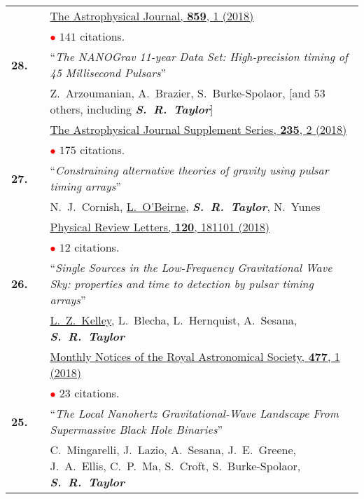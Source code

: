 \documentclass[11pt,letterpaper,sans]{moderncv}
\begin{document}
{\begin{longtable}{rp{0.3cm}p{15.8cm}}
&& \href{http://iopscience.iop.org/article/10.3847/1538-4357/aabd3b/meta}{{\color{color1} The Astrophysical Journal, \textbf{859}, 1 (2018)}}  \\
&& \textcolor{red}{$\bullet$} $141$ citations. \vspace{0.09cm}\\
\textbf{28.} & & ``\textit{The NANOGrav 11-year Data Set: High-precision timing of 45 Millisecond Pulsars}'' \\ 
&&Z.~Arzoumanian, A.~Brazier, S.~Burke-Spolaor, [and 53 others, including \textit{\textbf{S.~R.~Taylor}}]\\
&& \href{http://iopscience.iop.org/article/10.3847/1538-4365/aab5b0/meta}{{\color{color1} The Astrophysical Journal Supplement Series, \textbf{235}, 2 (2018)}}  \\
&& \textcolor{red}{$\bullet$} $175$ citations. \vspace{0.09cm}\\
\textbf{27.} & & ``\textit{Constraining alternative theories of gravity using pulsar timing arrays}'' \\ 
&&N.~J.~Cornish, \underline{L.~O'Beirne}, \textit{\textbf{S.~R.~Taylor}}, N.~Yunes\\
&& \href{https://journals.aps.org/prl/abstract/10.1103/PhysRevLett.120.181101}{{\color{color1} Physical Review Letters, \textbf{120}, 181101 (2018)}}  \\
&& \textcolor{red}{$\bullet$} $12$ citations. \vspace{0.09cm}\\
\textbf{26.} & & ``\textit{Single Sources in the Low-Frequency Gravitational Wave Sky: properties and time to detection by pulsar timing arrays}'' \\ 
&&\underline{L.~Z.~Kelley}, L.~Blecha, L.~Hernquist, A.~Sesana, \textit{\textbf{S.~R.~Taylor}} \\
&& \href{https://academic.oup.com/mnras/article-abstract/477/1/964/4937809?redirectedFrom=fulltext}{{\color{color1} Monthly Notices of the Royal Astronomical Society, \textbf{477}, 1 (2018)}}  \\
&& \textcolor{red}{$\bullet$} $23$ citations. \vspace{0.09cm}\\
\textbf{25.} & & ``\textit{The Local Nanohertz Gravitational-Wave Landscape From Supermassive Black Hole Binaries}'' \\ 
&&C.~Mingarelli, J.~Lazio, A.~Sesana, J.~E.~Greene, J.~A.~Ellis, C.~P.~Ma, S.~Croft, S.~Burke-Spolaor, \textit{\textbf{S.~R.~Taylor}} \\

\end{longtable}}
\end{document}
